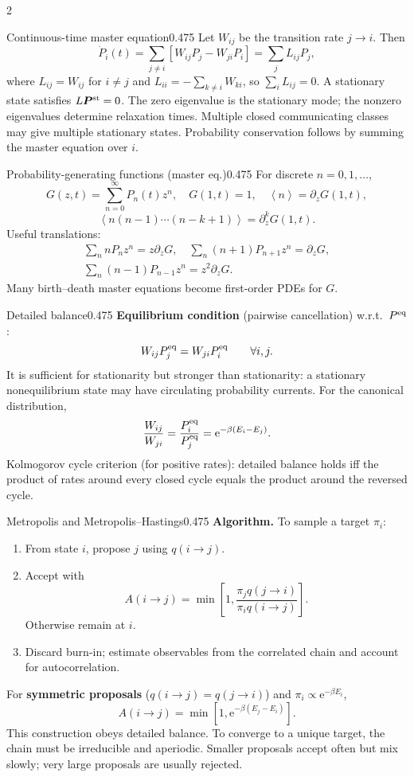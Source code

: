 \documentclass[8pt,a4paper]{extarticle}
\newcommand{\avg}[1]{\left\langle #1\right\rangle}
\newcommand{\e}{\mathrm e}
\begin{document}
\begin{multicols*}{2}
\begin{mytikzbox}{Continuous-time master equation}{0.475}
Let $W_{ij}$ be the transition rate $j\to i$. Then
\[
\dot P_i(t)=\sum_{j\ne i}\left[W_{ij}P_j-W_{ji}P_i\right]
=\sum_jL_{ij}P_j,
\]
where $L_{ij}=W_{ij}$ for $i\ne j$ and
$L_{ii}=-\sum_{k\ne i}W_{ki}$, so $\sum_iL_{ij}=0$.
A stationary state satisfies $L\bm P^{\rm st}=0$.
The zero eigenvalue is the stationary mode; the nonzero eigenvalues determine
relaxation times. Multiple closed communicating classes may give multiple
stationary states. Probability conservation follows by summing the master equation
over $i$.
\end{mytikzbox}

\begin{mytikzbox}{Probability-generating functions (master eq.)}{0.475}
For discrete $n=0,1,\ldots$,
\[
G(z,t)=\sum_{n=0}^\infty P_n(t)z^n,
\quad
G(1,t)=1,
\quad
\avg n=\partial_zG(1,t),
\]
\[
\avg{n(n-1)\cdots(n-k+1)}=\partial_z^kG(1,t).
\]
Useful translations:
\begin{gather*}
\sum_n nP_nz^n=z\partial_zG,
\quad
\sum_n(n+1)P_{n+1}z^n=\partial_zG,\\
\sum_n(n-1)P_{n-1}z^n=z^2\partial_zG.
\end{gather*}
Many birth--death master equations become first-order PDEs for $G$.
\end{mytikzbox}

\begin{mytikzbox}{Detailed balance}{0.475}
\textbf{Equilibrium condition} (pairwise cancellation) w.r.t.\ $P^{\rm eq}$:
\[
W_{ij}P_j^{\rm eq}=W_{ji}P_i^{\rm eq}
\qquad\forall i,j.
\]
It is sufficient for stationarity but stronger than stationarity: a stationary
nonequilibrium state may have circulating probability currents.
For the canonical distribution,
\[
\frac{W_{ij}}{W_{ji}}=\frac{P_i^{\rm eq}}{P_j^{\rm eq}}
=\e^{-\beta(E_i-E_j)}.
\]
Kolmogorov cycle criterion (for positive rates): detailed balance holds iff the
product of rates around every closed cycle equals the product around the reversed
cycle.
\end{mytikzbox}

\begin{mytikzbox}{Metropolis and Metropolis--Hastings}{0.475}
\textbf{Algorithm.} To sample a target $\pi_i$:
\begin{enumerate}
\item From state $i$, propose $j$ using $q(i\to j)$.
\item Accept with
\[
A(i\to j)=\min\!\left[1,
\frac{\pi_jq(j\to i)}{\pi_iq(i\to j)}\right].
\]
Otherwise remain at $i$.
\item Discard burn-in; estimate observables from the correlated chain and account
for autocorrelation.
\end{enumerate}
For \textbf{symmetric proposals} ($q(i\to j)=q(j\to i)$) and
$\pi_i\propto\e^{-\beta E_i}$,
\[
A(i\to j)=\min\!\left[1,\e^{-\beta(E_j-E_i)}\right].
\]
This construction obeys detailed balance. To converge to a unique target, the chain
must be irreducible and aperiodic. Smaller proposals accept often but mix slowly;
very large proposals are usually rejected.
\end{mytikzbox}


\end{multicols*}
\end{document}
